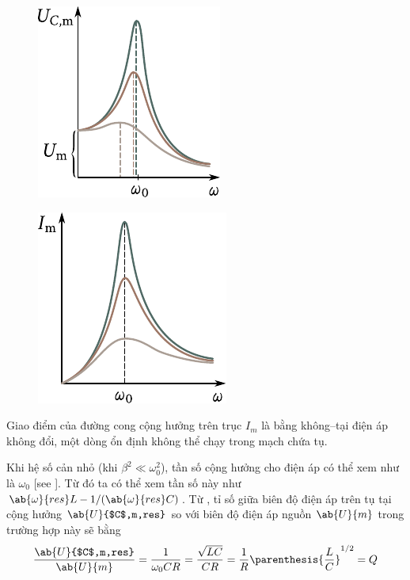 \begin{figure}[t]
	\begin{minipage}[t]{0.48\linewidth}
		\begin{center}
			\includegraphics[scale=1]{figures/ch_13/fig_13_7.pdf}
			\caption[]{}
			\label{fig:13_7}
		\end{center}
	\end{minipage}
	\hfill{ }%
	\begin{minipage}[t]{0.48\linewidth}
		\begin{center}
			\includegraphics[scale=1]{figures/ch_13/fig_13_8.pdf}
			\caption[]{}
			\label{fig:13_8}
		\end{center}
	\end{minipage}
\vspace{-0.4cm}
\end{figure}

Giao điểm của đường cong cộng hưởng trên trục $I_m$ là bằng không--tại điện áp không đổi, một dòng ổn định không thể chạy trong mạch chứa tụ.

Khi hệ số cản nhỏ (khi $\beta^2\ll\omega_0^2$), tần số cộng hưởng cho điện áp có thể xem như là $\omega_0$ [see ].
Từ đó ta có thể xem tần số này như $\ab{\omega}{res}L-1/(\ab{\omega}{res}C)$.
Từ , tỉ số giữa biên độ điện áp trên tụ tại cộng hưởng $\ab{U}{$C$,m,res}$ so với biên độ điện áp nguồn $\ab{U}{m}$ trong trường hợp này sẽ bằng
\begin{equation}\label{eq:13_43}
    \frac{\ab{U}{$C$,m,res}}{\ab{U}{m}} = \frac{1}{\omega_0 CR} = \frac{\sqrt{LC}}{CR} = \frac{1}{R} \parenthesis{\frac{L}{C}}^{1/2} = Q
\end{equation}

